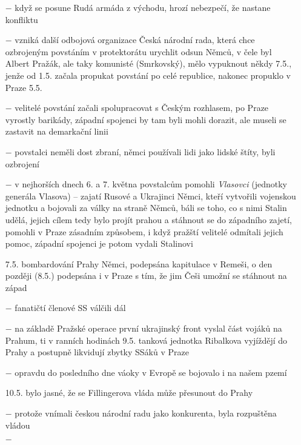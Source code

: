 \documentclass{article}
\begin{document}
\begin{itemize}
    \item[$-$] když se posune Rudá armáda z východu, hrozí nebezpečí, že nastane konfliktu
    \item[$-$] vzniká další odbojová organizace Česká národní rada, která chce ozbrojeným povstáním v protektorátu urychlit odsun Němců, v čele byl Albert Pražák, ale taky komunisté (Smrkovský), mělo vypuknout někdy 7.5., jenže od 1.5. začala propukat povstání po celé republice, nakonec propuklo v Praze 5.5.
    \item[$-$] velitelé povstání začali spolupracovat s Českým rozhlasem, po Praze vyrostly barikády, západní spojenci by tam byli mohli dorazit, ale museli se zastavit na demarkační linii
    \item[$-$] povstalci neměli dost zbraní, němci používali lidi jako lidské štíty, byli ozbrojení
    \item[$-$] v nejhorších dnech 6. a 7. května povstalcům pomohli \textit{Vlasovci} (jednotky generála Vlasova) -- zajatí Rusové a Ukrajinci Němci, kteří vytvořili vojenskou jednotku a bojovali za války na straně Němců, báli se toho, co s nimi Stalin udělá, jejich cílem tedy bylo projít prahou a stáhnout se do západního zajetí, pomohli v Praze zásadním způsobem, i když pražští velitelé odmítali jejich pomoc, západní spojenci je potom vydali Stalinovi
    \item[7.5.] bombardování Prahy Němci, podepsána kapitulace v Remeši, o den později (8.5.) podepsána i v Praze s tím, že jim Češi umožní se stáhnout na západ
    \item[$-$] fanatičtí členové SS válčili dál
    \item[$-$] na základě Pražské operace první ukrajinský front vyslal část vojáků na Prahum, ti v ranních hodinách 9.5. tanková jednotka Ribalkova vyjíždějí do Prahy a postupně likvidují zbytky SSáků v Praze
    \item[$-$] opravdu do posledního dne váoky v Evropě se bojovalo i na našem pzemí
    \item[10.5.] bylo jasné, že se Fillingerova vláda může přesunout do Prahy
    \item[$-$] protože vnímali českou národní radu jako konkurenta, byla rozpuštěna vládou
    \item[$-$]
\end{itemize}
\end{document}
